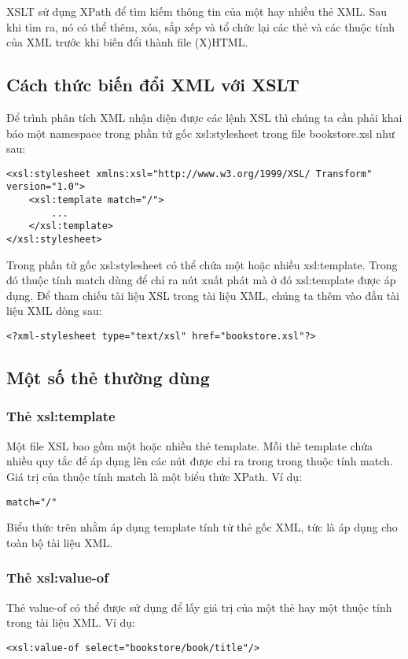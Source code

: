 XSLT sử dụng XPath để tìm kiếm thông tin của một hay nhiều thẻ XML. Sau khi tìm ra, nó có thể thêm, xóa, sắp xếp và tổ chức lại các thẻ và các thuộc tính của XML trước khi biến đổi thành file (X)HTML. 

\subsection {Cách thức biến đổi XML với XSLT}
Để trình phân tích XML nhận diện được các lệnh XSL thì chúng ta cần phải khai báo một namespace trong phần tử gốc {\ttfamily xsl:stylesheet} trong file bookstore.xsl như sau:
\lstset{language=XML}
\begin{lstlisting}[escapechar=`]
<xsl:stylesheet xmlns:xsl="http://www.w3.org/1999/XSL/ Transform" version="1.0">
	<xsl:template match="/">
		...
	</xsl:template>
</xsl:stylesheet>
\end{lstlisting}

Trong phần tử gốc {\ttfamily xsl:stylesheet} có thể chứa một hoặc nhiều {\ttfamily xsl:template}. Trong đó thuộc tính match dùng để chỉ ra nút xuất phát mà ở đó {\ttfamily xsl:template} được áp dụng.
Để tham chiếu tài liệu XSL trong tài liệu XML, chúng ta thêm vào đầu tài liệu XML dòng sau:
\lstset{language=XML}
\begin{lstlisting}[escapechar=`]
<?xml-stylesheet type="text/xsl" href="bookstore.xsl"?>
\end{lstlisting}

\subsection{ Một số thẻ thường dùng}
\subsubsection {Thẻ xsl:template}
Một file XSL bao gồm một hoặc nhiều thẻ {\ttfamily template}. Mỗi thẻ {\ttfamily template} chứa nhiều quy tắc để áp dụng lên các nút được chỉ ra trong trong thuộc tính match. Giá trị của thuộc tính {\ttfamily match }là một biểu thức XPath. Ví dụ:
\lstset{language=XML}
\begin{lstlisting}[escapechar=`]
	match="/"
\end{lstlisting}

Biểu thức trên nhằm áp dụng template tính từ thẻ gốc XML, tức là áp dụng cho toàn bộ tài liệu XML.
\subsubsection {Thẻ xsl:value-of}
Thẻ {\ttfamily value-of} có thể được sử dụng để lấy giá trị của một thẻ hay một thuộc tính trong tài liệu XML. Ví dụ:
\lstset{language=XML}
\begin{lstlisting}[escapechar=`]
	<xsl:value-of select="bookstore/book/title"/>
\end{lstlisting}

